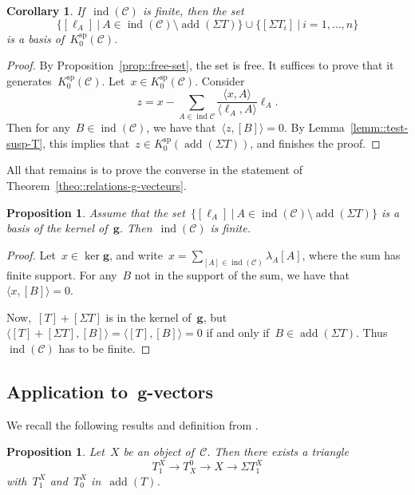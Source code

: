 \documentclass{amsart}
\newtheorem{corollary}[theorem]{Corollary}
\newtheorem{proposition}[theorem]{Proposition}
\theoremstyle{definition}
\renewcommand{\b}[1]{{\boldsymbol{#1}}} %
\newcommand{\cat}{\mathcal{C}}
\newcommand{\susp}{\Sigma}
\newcommand{\add}{\operatorname{add}}
\newcommand{\spl}{\operatorname{sp}}
\newcommand{\Ksp}{K_0^{\spl}}
\newcommand{\ind}{\operatorname{ind}}
\begin{document}
\begin{corollary}
 If~$\ind(\cat)$ is finite, then the set~\[\{[\ell_A] \ | \ A\in \ind(\cat) \setminus \add(\susp T) \} \cup \{[\susp T_i] \ | \ i=1, \ldots, n\}\] is a basis of~$\Ksp(\cat)$.
\end{corollary}
\begin{proof}
 By Proposition~\ref{prop::free-set}, the set is free.  It suffices to prove that it generates~$\Ksp(\cat)$.  Let~$x\in \Ksp(\cat)$.  Consider
 \[
  z = x - \sum_{A\in \ind{\cat}} \frac{\langle x, A \rangle}{\langle \ell_A, A\rangle} \ell_A.
 \]
 Then for any~$B\in \ind(\cat)$, we have that~$\langle z, [B] \rangle = 0$.  By Lemma~\ref{lemm::test-susp-T}, this implies that~$z\in \Ksp(\add(\susp T))$, and finishes the proof.
\end{proof}


All that remains is to prove the converse in the statement of Theorem~\ref{theo::relations-g-vecteurs}.

\begin{proposition}
 Assume that the set~$\{[\ell_A] \ | \ A\in \ind(\cat) \setminus \add(\susp T) \}$ is a basis of the kernel of~$\b g$. Then~$\ind(\cat)$ is finite.
\end{proposition}
\begin{proof}
 Let~$x\in \ker \b g$, and write~$x = \sum_{[A]\in \ind(\cat)} \lambda_A[A]$, where the sum has finite support.  For any~$B$ not in the support of the sum, we have that~$\langle x, [B] \rangle = 0$.
 
 Now,~$[T]+[\susp T]$ is in the kernel of~$\b g$, but~$\langle [T] + [\susp T], [B] \rangle = \langle [T], [B] \rangle = 0$ if and only if~$B\in \add(\susp T)$.  Thus~$\ind(\cat)$ has to be finite.
\end{proof}







\subsection{Application to~$\b g$-vectors}\label{sect::applications-g-vectors}

We recall the following results and definition from \cite{DehyKeller,Palu}.

\begin{proposition}
 Let~$X$ be an object of~$\cat$. Then there exists a triangle
 \[
  T_1^X \to T^0_X \to X \to \susp T_1^X
 \]
 with~$T_1^X$ and~$T_0^X$ in~$\add(T)$.

\end{proposition}
\end{document}
